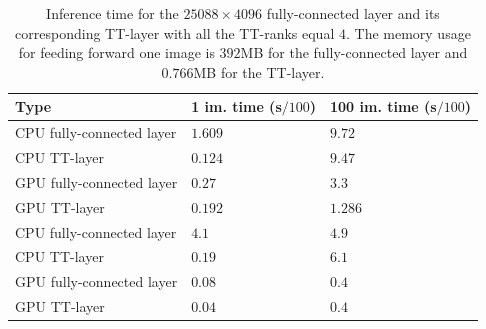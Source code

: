\begin{table}
    \begin{center}
    \begin{tabular}{l| l l}
    Type & 1 im. time (s$/100$) & 100 im. time (s$/100$) \rule{0pt}{1.0\normalbaselineskip}\\ \hline
    CPU fully-connected layer   & $1.609$ & $9.72$ \rule{0pt}{1.0\normalbaselineskip}\\
    CPU TT-layer   & $0.124$ & $9.47$\\
    GPU fully-connected layer   & $0.27$ & $3.3$\\
    GPU TT-layer   & $0.192$ & $1.286$\\
    \hline
    CPU fully-connected layer   & $4.1$ & $4.9$ \rule{0pt}{1.0\normalbaselineskip}\\
    CPU TT-layer   & $0.19$ & $6.1$\\
    GPU fully-connected layer   & $0.08$ & $0.4$\\
    GPU TT-layer   & $0.04$ & $0.4$\\
    \end{tabular}
    \end{center}
    \caption{Inference time for the $25088 \times 4096$ fully-connected layer and its corresponding TT-layer with all the TT-ranks equal $4$. The memory usage for feeding forward one image is $392$MB for the fully-connected layer and $0.766$MB for the TT-layer. \label{tbl:imegenet-inference} \vspace{-0.5cm}}
\end{table}




